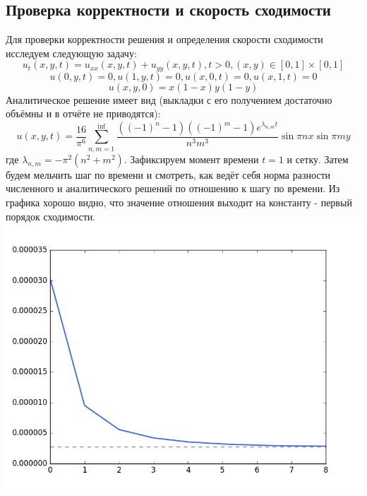 \documentclass[paper=a4, fontsize=13pt]{scrartcl} %
\numberwithin{equation}{section} %
\numberwithin{figure}{section} %
\numberwithin{table}{section} %
\begin{document}
\subsection{Проверка корректности и скорость сходимости}
Для проверки корректности решения и определения скорости сходимости исследуем следующую задачу:
$$u_t(x, y, t) = u_{xx}(x, y, t) + u_{yy}(x, y, t), t > 0, (x, y) \in [0, 1] \times [0, 1]$$
$$u(0, y, t) = 0, u(1, y, t) = 0, u(x, 0, t) = 0, u(x, 1, t) = 0$$
$$u(x, y, 0) = x(1 - x)y(1-y)$$
Аналитическое решение имеет вид (выкладки с его получением достаточно объёмны и в отчёте не приводятся):
$$u(x, y, t) = \frac{16}{\pi^6} \sum^{\inf}_{n,m=1} \frac{((-1)^n - 1)((-1)^m - 1)e^{\lambda_{n,m}t}}{n^3m^3} \sin{\pi n x} \sin{\pi m y}$$
где $\lambda_{n,m} = - \pi^2(n^2 + m^2)$. Зафиксируем момент времени $t = 1$ и сетку. Затем будем мельчить шаг по времени и смотреть, как ведёт себя норма разности численного и аналитического решений по отношению к шагу по времени. Из графика хорошо видно, что значение отношения выходит на константу - первый порядок сходимости. \\
\includegraphics[scale=0.5]{t_order} \\
\newpage
\end{document}
